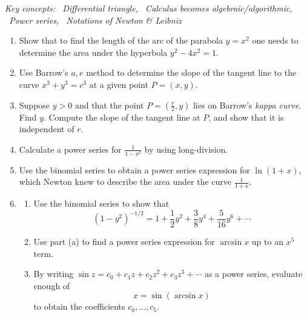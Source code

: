 \begin{exercises}{}{}
	\hangindent\leftmargini\emph{Key concepts: \ Differential triangle, \ Calculus becomes algebraic/algorithmic, \ Power series, \ Notations of Newton \& Leibniz}

	\begin{enumerate}	  
		\item %
	Show that to find the length of the arc of the parabola $y=x^2$ one needs to determine the area under the hyperbola $y^2-4x^2=1$.
	
	
		\item%
		Use Barrow's $a,e$ method to determine the slope of the tangent line to the curve $x^3+y^3=c^3$ at a given point $P=(x,y)$.
		

	  \item Suppose $y>0$ and that the point $P=(\frac r2,y)$ lies on Barrow's \emph{kappa curve}. Find $y$. Compute the slope of the \textcolor{mGreen}{tangent line} at $P$, and show that it is independent of $r$.
		
		
		\item%
		Calculate a power series for $\frac 1{1-x^2}$ by using long-division.
		
		
		\item Use the binomial series to obtain a power series expression for $\ln(1+x)$, which Newton knew to describe the area under the curve $\frac 1{1+x}$. 
		

	\item\label{exs:sineseries}
	  \begin{enumerate}
	    \item Use the binomial series to show that
		  \[
		  	(1-y^2)^{-1/2}=1+\frac 12y^2+\frac 38y^4+\frac 5{16}y^6+\cdots
		  \]
		  \item Use part (a) to find a power series expression for $\arcsin x$ up to an $x^5$ term.
		  \item By writing $\sin z=c_0+c_1z+c_2z^2+c_3z^3+\cdots$ as a power series, evaluate enough of
		  \[
		  	x=\sin\left(\arcsin x\right)
		  \]
		  to obtain the coefficients $c_0,\ldots,c_5$.
		\end{enumerate}
% 	  
	  
	
		

\end{enumerate}
\end{exercises}
